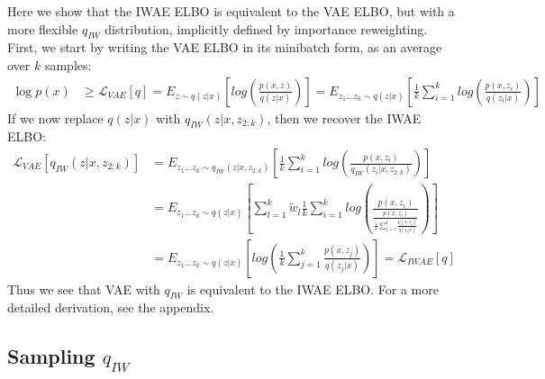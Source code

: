\documentclass{article} %
\begin{document}
Here we show that the IWAE ELBO is equivalent to the VAE ELBO, but with a more flexible $q_{IW}$ distribution, implicitly defined by importance reweighting.
First, we start by writing the VAE ELBO in its minibatch form, as an average over $k$ samples:
\begin{align} 
    \log p(x) &\geq 
    \mathcal{L}_{VAE}[q] =
    E_{z \sim q(z|x)} \left[  log\left(\frac{p(x,z)}{q(z|x)} \right) \right]  
    = E_{z_{1}...z_{k} \sim q(z|x)} \left[  \frac{1}{k}\sum_{i=1}^k log\left(\frac{p(x,z_i)}{q(z_i|x)} \right) \right]
\label{eq:eiw}
\end{align}
If we now replace $q(z|x)$ with $q_{IW}(z|x,z_{2:k})$, then we recover the IWAE ELBO:
\begin{align}
        \mathcal{L}_{VAE}[q_{IW}(z|x,z_{2:k})]
        &= E_{z_{1}...z_{k} \sim q_{IW}(z|x,z_{2:k})} \left[  \frac{1}{k}\sum_{i=1}^k log\left(\frac{p(x,z_i)}{q_{IW}(z_i|x,z_{2:k})}  \right)  \right] \\
    &= E_{z_{1}...z_{k} \sim q(z|x)} \left[ \sum_{l=1}^k \tilde w_l \frac{1}{k}\sum_{i=1}^k log\left(\frac{p(x,z_i)}{\frac{p(x,z_i)}{\frac{1}{k}   \sum_{j=1}^k \frac{p(x,z_j)}{q(z_j|x)}}}  \right)  \right] \\
    &= E_{z_{1}...z_{k} \sim q(z|x)} \left[  log\left(\frac{1}{k}\sum_{j=1}^k \frac{p(x,z_j)}{q(z_j|x)}  \right)  \right] = \mathcal{L}_{IWAE}[q]
\end{align}
Thus we see that VAE with $q_{IW}$ is equivalent to the IWAE ELBO.  For a more detailed derivation, see the appendix.




\subsection{Sampling \texorpdfstring{$q_{IW}$}{}}
\end{document}
